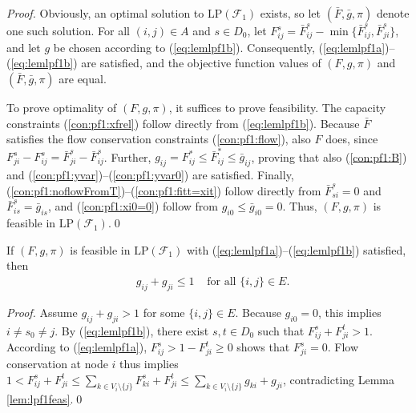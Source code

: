 \begin{proof}
Obviously, an optimal solution to $\text{LP}(\mathcal{F}_1)$ exists, so let $(\bar{F},\bar{g},\pi)$ denote one such solution.
For all $(i,j)\in A$ and $s\in D_0$, let $F_{ij}^s=\bar{F}_{ij}^s-\min\{\bar{F}_{ij}^s, \bar{F}_{ji}^s\}$, and let $g$ be chosen according to (\ref{eq:lemlpf1b}).
Consequently, (\ref{eq:lemlpf1a})--(\ref{eq:lemlpf1b}) are satisfied, and the objective function values of $(F,g,\pi)$ and $(\bar{F},\bar{g},\pi)$ are equal.

To prove optimality of $(F,g,\pi)$, it suffices to prove feasibility.
The capacity constraints (\ref{con:pf1:xfrel}) follow directly from (\ref{eq:lemlpf1b}).
Because $\bar{F}$ satisfies the flow conservation constraints (\ref{con:pf1:flow}), also $F$ does, since
$F_{ji}^s-F_{ij}^s=\bar{F}_{ji}^s-\bar{F}_{ij}^s$.
Further, $g_{ij}=F_{ij}^*\leq\bar{F}_{ij}^*\leq\bar{g}_{ij}$, proving that also (\ref{con:pf1:B}) and (\ref{con:pf1:yvar})--(\ref{con:pf1:yvar0}) are satisfied.
Finally, (\ref{con:pf1:noflowFromT})--(\ref{con:pf1:fitt=xit}) follow directly from $\bar{F}_{si}^s=0$ and $\bar{F}_{is}^s=\bar{g}_{is}$,
and (\ref{con:pf1:xi0=0}) follow from $g_{i0}\leq \bar{g}_{i0}=0$.
Thus, $(F,g,\pi)$ is feasible in $\text{LP}(\mathcal{F}_1)$.\qed
\end{proof}

\begin{lemma} \label{lem:lpf1gijgji}
If $(F,g,\pi)$ is feasible in $\text{LP}(\mathcal{F}_1)$ with (\ref{eq:lemlpf1a})--(\ref{eq:lemlpf1b}) satisfied, then
\begin{equation}
\begin{aligned}
 & g_{ij}+g_{ji} \leq 1 & \text{ for all } \{i,j\}\in E. \label{eq:lemlpf1c}
\end{aligned}
\end{equation}
\end{lemma}
\begin{proof}
Assume $g_{ij}+g_{ji}>1$ for some $\{i,j\}\in E$.
Because $g_{i0}=0$, this implies $i\neq s_0\neq j$.
By (\ref{eq:lemlpf1b}), there exist $s,t\in D_0$ such that $F_{ij}^s+F_{ji}^t>1$.
According to (\ref{eq:lemlpf1a}), $F_{ij}^s>1-F_{ji}^t\geq 0$ shows that $F_{ji}^s=0$.
Flow conservation at node $i$ thus implies $1<F_{ij}^s+F_{ji}^t\leq\sum_{k\in V_i\setminus\{j\}}F_{ki}^s+F_{ji}^t
\leq\sum_{k\in V_i\setminus\{j\}}g_{ki}+g_{ji}$, contradicting Lemma \ref{lem:lpf1feas}.\qed
\end{proof}

